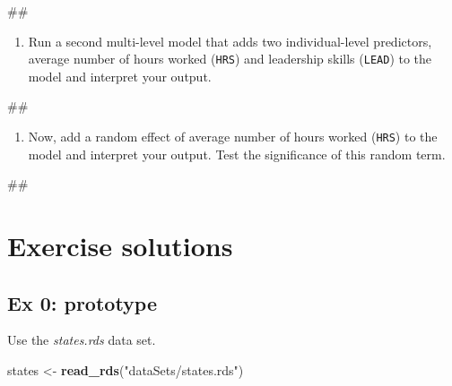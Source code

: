 \documentclass[]{book}
\newenvironment{Shaded}{\begin{snugshade}}{\end{snugshade}}
\newcommand{\KeywordTok}[1]{\textcolor[rgb]{0.13,0.29,0.53}{\textbf{#1}}}
\newcommand{\StringTok}[1]{\textcolor[rgb]{0.31,0.60,0.02}{#1}}
\newcommand{\NormalTok}[1]{#1}
\providecommand{\tightlist}{%
  \setlength{\itemsep}{0pt}\setlength{\parskip}{0pt}}
\begin{document}
\begin{Shaded}
\begin{Highlighting}[]
\NormalTok{## }
\end{Highlighting}
\end{Shaded}

\begin{enumerate}
\def\labelenumi{\arabic{enumi}.}
\setcounter{enumi}{2}
\tightlist
\item
  Run a second multi-level model that adds two individual-level
  predictors, average number of hours worked (\texttt{HRS}) and
  leadership skills (\texttt{LEAD}) to the model and interpret your
  output.
\end{enumerate}

\begin{Shaded}
\begin{Highlighting}[]
\NormalTok{## }
\end{Highlighting}
\end{Shaded}

\begin{enumerate}
\def\labelenumi{\arabic{enumi}.}
\setcounter{enumi}{3}
\tightlist
\item
  Now, add a random effect of average number of hours worked
  (\texttt{HRS}) to the model and interpret your output. Test the
  significance of this random term.
\end{enumerate}

\begin{Shaded}
\begin{Highlighting}[]
\NormalTok{## }
\end{Highlighting}
\end{Shaded}

\section{Exercise solutions}\label{exercise-solutions-1}

\subsection{Ex 0: prototype}\label{ex-0-prototype-1}

Use the \emph{states.rds} data set.

\begin{Shaded}
\begin{Highlighting}[]
\NormalTok{  states <-}\StringTok{ }\KeywordTok{read_rds}\NormalTok{(}\StringTok{"dataSets/states.rds"}\NormalTok{)}
\end{Highlighting}
\end{Shaded}
\end{document}
